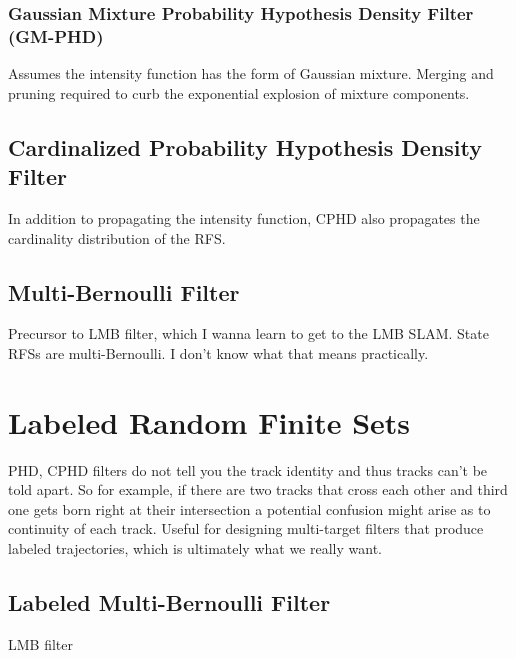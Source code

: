 \documentclass[a4paper,10pt]{scrreprt}
\theoremstyle{theorem}
\theoremstyle{definition}
\begin{document}
\subsection{Gaussian Mixture Probability Hypothesis Density Filter (GM-PHD)}\label{ssec:gaussian_mixture_phd_filter}
Assumes the intensity function has the form of Gaussian mixture.
Merging and pruning required to curb the exponential explosion of mixture components.

\section{Cardinalized Probability Hypothesis Density Filter}\label{sec:cardinalized_phd_filter}
In addition to propagating the intensity function, CPHD also propagates the cardinality distribution of the RFS.

\section{Multi-Bernoulli Filter}
Precursor to LMB filter, which I wanna learn to get to the LMB SLAM.
State RFSs are multi-Bernoulli. 
I don't know what that means practically.




\chapter{Labeled Random Finite Sets}\label{ch:labeled_random_finite_sets}
PHD, CPHD filters do not tell you the track identity and thus tracks can't be told apart. 
So for example, if there are two tracks that cross each other and third one gets born right at their intersection a potential confusion might arise as to continuity of each track.
Useful for designing multi-target filters that produce labeled trajectories, which is ultimately what we really want.

\section{Labeled Multi-Bernoulli Filter}\label{sec:labeled_multi-bernoulli_filter}
LMB filter





\end{document}
